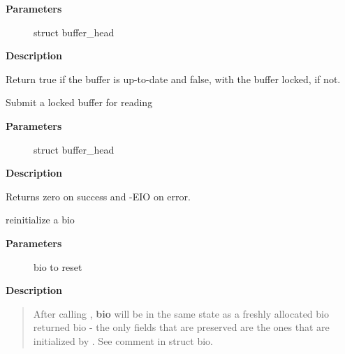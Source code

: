 \documentclass[a4paper,8pt,english]{sphinxmanual}
\begin{document}
\textbf{Parameters}
\begin{description}
\item[{}] \leavevmode
struct buffer\_head

\end{description}

\textbf{Description}

Return true if the buffer is up-to-date and false,
with the buffer locked, if not.

\begin{fulllineitems}
\label{filesystems/index:c.bh_submit_read}
Submit a locked buffer for reading

\end{fulllineitems}


\textbf{Parameters}
\begin{description}
\item[{}] \leavevmode
struct buffer\_head

\end{description}

\textbf{Description}

Returns zero on success and -EIO on error.

\begin{fulllineitems}
\label{filesystems/index:c.bio_reset}
reinitialize a bio

\end{fulllineitems}


\textbf{Parameters}
\begin{description}
\item[{}] \leavevmode
bio to reset

\end{description}

\textbf{Description}
\begin{quote}

After calling {\hyperref[filesystems/index:c.bio_reset]{\emph{}}}, \textbf{bio} will be in the same state as a freshly
allocated bio returned bio {\hyperref[filesystems/index:c.bio_alloc_bioset]{\emph{}}} - the only fields that are
preserved are the ones that are initialized by {\hyperref[filesystems/index:c.bio_alloc_bioset]{\emph{}}}. See
comment in struct bio.
\end{quote}
\end{document}
